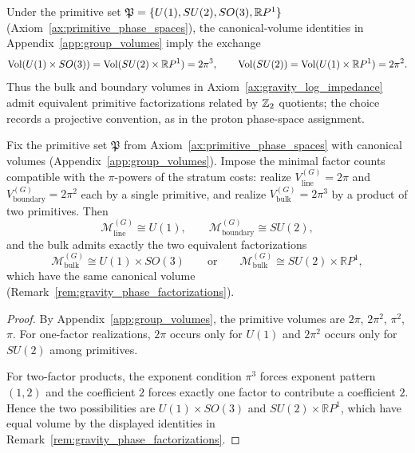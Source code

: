 \begin{remark}\label{rem:gravity_phase_factorizations}
Under the primitive set $\mathfrak{P}=\{U(1),SU(2),SO(3),\mathbb{R} P^1\}$ (Axiom~\ref{ax:primitive_phase_spaces}), the canonical-volume identities in Appendix~\ref{app:group_volumes} imply the exchange
\[
\mathrm{Vol}(U(1)\times SO(3))=\mathrm{Vol}(SU(2)\times \mathbb{R} P^1)=2\pi^3,
\qquad
\mathrm{Vol}(SU(2))=\mathrm{Vol}(U(1)\times \mathbb{R} P^1)=2\pi^2.
\]
Thus the bulk and boundary volumes in Axiom~\ref{ax:gravity_log_impedance} admit equivalent primitive factorizations related by $\mathbb{Z}_2$ quotients; the choice records a projective convention, as in the proton phase-space assignment.
\end{remark}

\begin{proposition}\label{prop:gravity_phase_factorization_rigidity}
Fix the primitive set $\mathfrak{P}$ from Axiom~\ref{ax:primitive_phase_spaces} with canonical volumes (Appendix~\ref{app:group_volumes}). Impose the minimal factor counts compatible with the $\pi$-powers of the stratum costs: realize $V^{(G)}_{\mathrm{line}}=2\pi$ and $V^{(G)}_{\mathrm{boundary}}=2\pi^2$ each by a single primitive, and realize $V^{(G)}_{\mathrm{bulk}}=2\pi^3$ by a product of two primitives. Then
\[
\mathcal{M}^{(G)}_{\mathrm{line}}\cong U(1),\qquad
\mathcal{M}^{(G)}_{\mathrm{boundary}}\cong SU(2),
\]
and the bulk admits exactly the two equivalent factorizations
\[
\mathcal{M}^{(G)}_{\mathrm{bulk}}\cong U(1)\times SO(3)
\qquad\text{or}\qquad
\mathcal{M}^{(G)}_{\mathrm{bulk}}\cong SU(2)\times \mathbb{R}P^1,
\]
which have the same canonical volume (Remark~\ref{rem:gravity_phase_factorizations}).
\end{proposition}
\begin{proof}
By Appendix~\ref{app:group_volumes}, the primitive volumes are $2\pi$, $2\pi^2$, $\pi^2$, $\pi$. For one-factor realizations, $2\pi$ occurs only for $U(1)$ and $2\pi^2$ occurs only for $SU(2)$ among primitives.

For two-factor products, the exponent condition $\pi^3$ forces exponent pattern $(1,2)$ and the coefficient $2$ forces exactly one factor to contribute a coefficient $2$. Hence the two possibilities are $U(1)\times SO(3)$ and $SU(2)\times \mathbb{R}P^1$, which have equal volume by the displayed identities in Remark~\ref{rem:gravity_phase_factorizations}.
\end{proof}

